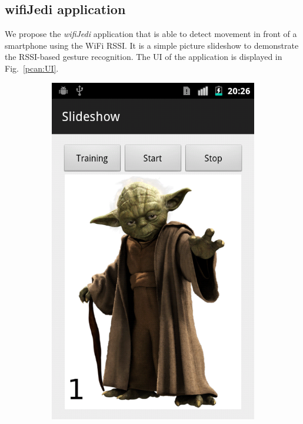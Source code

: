 \documentclass[conference]{IEEEtran}
\begin{document}
\subsection{wifiJedi application}
We propose the \emph{wifiJedi} application that is able to detect movement in front of a smartphone using the WiFi RSSI.
It is a simple picture slideshow to demonstrate the RSSI-based gesture recognition.
The UI of the application is displayed in Fig.~\ref{pcan:UI}.
\begin{figure}
\centering
\begin{subfigure}[b]{0.2\textwidth}
\includegraphics[width=\textwidth]{./pics/screen03}

\end{subfigure}
\end{figure}
\end{document}

